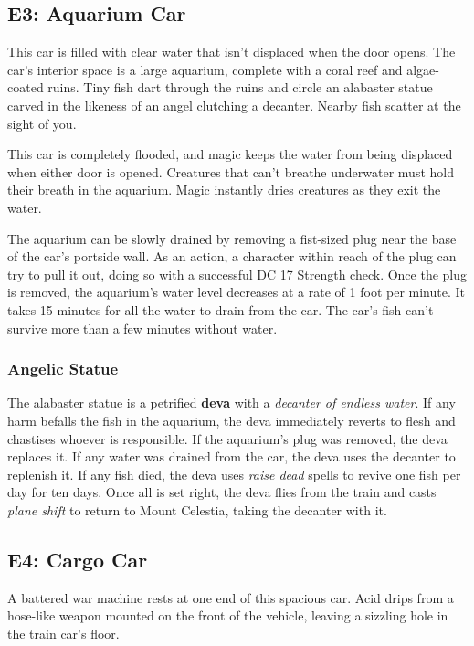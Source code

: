 \documentclass[10pt,a4paper,twoside,bg=print,twocolumn,openany,nodeprecatedcode]{dndbook}
\begin{document}
\subsection{E3: Aquarium Car}
\begin{DndReadAloud}{}
This car is filled with clear water that isn't displaced when the door opens. The car's interior space is a large aquarium, complete with a coral reef and algae-coated ruins. Tiny fish dart through the ruins and circle an alabaster statue carved in the likeness of an angel clutching a decanter. Nearby fish scatter at the sight of you.

\end{DndReadAloud}

This car is completely flooded, and magic keeps the water from being displaced when either door is opened. Creatures that can't breathe underwater must hold their breath in the aquarium. Magic instantly dries creatures as they exit the water.

The aquarium can be slowly drained by removing a fist-sized plug near the base of the car's portside wall. As an action, a character within reach of the plug can try to pull it out, doing so with a successful DC 17 Strength check. Once the plug is removed, the aquarium's water level decreases at a rate of 1 foot per minute. It takes 15 minutes for all the water to drain from the car. The car's fish can't survive more than a few minutes without water.

\subsubsection{Angelic Statue}
The alabaster statue is a petrified \textbf{deva} with a \textit{decanter of endless water}. If any harm befalls the fish in the aquarium, the deva immediately reverts to flesh and chastises whoever is responsible. If the aquarium's plug was removed, the deva replaces it. If any water was drained from the car, the deva uses the decanter to replenish it. If any fish died, the deva uses \textit{raise dead} spells to revive one fish per day for ten days. Once all is set right, the deva flies from the train and casts \textit{plane shift} to return to Mount Celestia, taking the decanter with it.

\subsection{E4: Cargo Car}
\begin{DndReadAloud}{}
A battered war machine rests at one end of this spacious car. Acid drips from a hose-like weapon mounted on the front of the vehicle, leaving a sizzling hole in the train car's floor.

\end{DndReadAloud}
\end{document}
